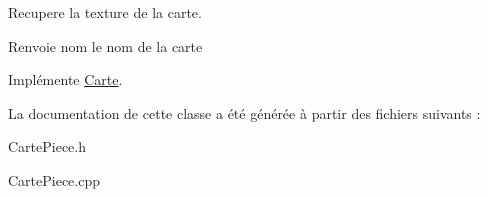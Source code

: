 \-Recupere la texture de la carte. 

\begin{DoxyReturn}{\-Renvoie}
nom le nom de la carte 
\end{DoxyReturn}


\-Implémente \hyperlink{classCarte_ad881bc9e55ab5feb4884d0efdcbf46ed}{\-Carte}.



\-La documentation de cette classe a été générée à partir des fichiers suivants \-:\begin{DoxyCompactItemize}
\item 
\-Carte\-Piece.\-h\item 
\-Carte\-Piece.\-cpp\end{DoxyCompactItemize}

